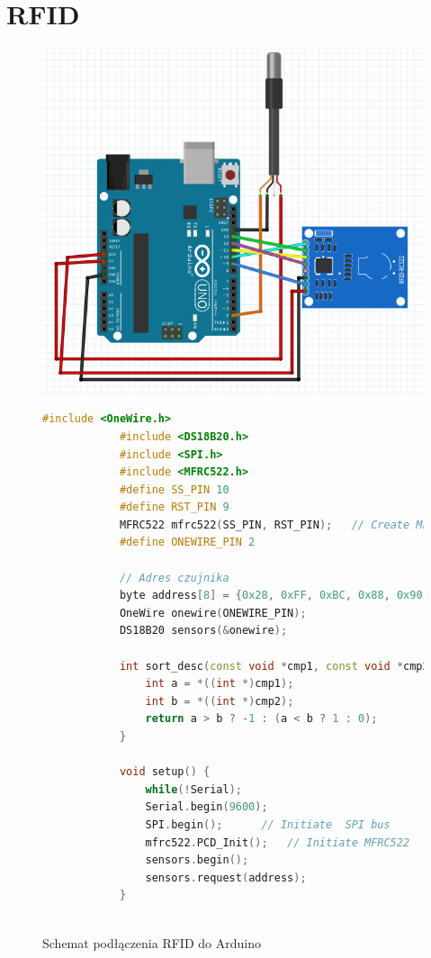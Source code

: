 \documentclass[polish,a4paper]{article}
\begin{document}
	\newpage
	\[\] \\
	\section{RFID}
	\begin{figure}[h!]
		\begin{center}
			\includegraphics[scale=0.4]{02_rfid_reader.png}
			\caption*{Schemat podłączenia RFID do Arduino}
		\end{center}
		\begin{lstlisting}[language=C++, basicstyle=\tiny]
			#include <OneWire.h>
			#include <DS18B20.h>
			#include <SPI.h>
			#include <MFRC522.h>
			#define SS_PIN 10
			#define RST_PIN 9
			MFRC522 mfrc522(SS_PIN, RST_PIN);   // Create MFRC522 instance.
			#define ONEWIRE_PIN 2
			
			// Adres czujnika
			byte address[8] = {0x28, 0xFF, 0xBC, 0x88, 0x90, 0x17, 0x5, 0x76};
			OneWire onewire(ONEWIRE_PIN);
			DS18B20 sensors(&onewire);
			
			int sort_desc(const void *cmp1, const void *cmp2){
				int a = *((int *)cmp1);
				int b = *((int *)cmp2);
				return a > b ? -1 : (a < b ? 1 : 0);
			}
			
			void setup() {
				while(!Serial);
				Serial.begin(9600);
				SPI.begin();      // Initiate  SPI bus
				mfrc522.PCD_Init();   // Initiate MFRC522
				sensors.begin();
				sensors.request(address);
			}
			

\end{lstlisting}
\end{figure}
\end{document}
